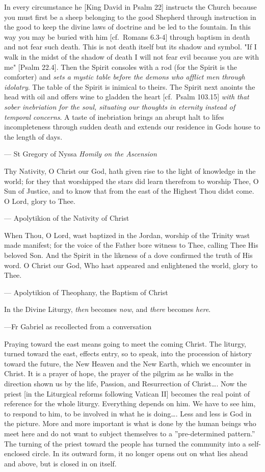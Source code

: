 \documentclass[
]{article}
\newcommand{\RL}[1]{\beginR #1\endR}
\begin{document}
In every circumstance he {[}King David in Psalm 22{]} instructs the
Church because you must first be a sheep belonging to the good Shepherd
through instruction in the good to keep the divine laws of doctrine and
be led to the fountain. In this way you may be buried with him
{[}cf.~Romans 6.3-4{]} through baptism in death and not fear such death.
This is not death itself but its shadow and symbol. "If I walk in the
midst of the shadow of death I will not fear evil because you are with
me" {[}Psalm 22.4{]}. Then the Spirit consoles with a rod (for the
Spirit is the comforter) and \emph{sets a mystic table before the demons
who afflict men through idolatry}. The table of the Spirit is inimical
to theirs. The Spirit next anoints the head with oil and offers wine to
gladden the heart {[}cf.~Psalm 103.15{]} \emph{with that sober
inebriation for the soul, situating our thoughts in eternity instead of
temporal concerns}. A taste of inebriation brings an abrupt halt to
life\textquotesingle s incompleteness through sudden death and extends
our residence in God\textquotesingle s house to the length of days.

--- St Gregory of Nyssa \emph{Homily on the Ascension}

Thy Nativity, O Christ our God, hath given rise to the light of
knowledge in the world; for they that worshipped the stars did learn
therefrom to worship Thee, O Sun of Justice, and to know that from the
east of the Highest Thou didst come. O Lord, glory to Thee.

--- Apolytikion of the Nativity of Christ

When Thou, O Lord, wast baptized in the Jordan, worship of the Trinity
wast made manifest; for the voice of the Father bore witness to Thee,
calling Thee His beloved Son. And the Spirit in the likeness of a dove
confirmed the truth of His word. O Christ our God, Who hast appeared and
enlightened the world, glory to Thee.

--- Apolytikion of Theophany, the Baptism of Christ

In the Divine Liturgy, \emph{then} becomes \emph{now}, and \emph{there}
becomes \emph{here}.

---Fr Gabriel as recollected from a conversation

Praying toward the east means going to meet the coming Christ. The
liturgy, turned toward the east, effects entry, so to speak, into the
procession of history toward the future, the New Heaven and the New
Earth, which we encounter in Christ. It is a prayer of hope, the prayer
of the pilgrim as he walks in the direction shown us by the life,
Passion, and Resurrection of Christ\ldots. Now the priest {[}in the
Liturgical reforms following Vatican II{]} becomes the real point of
reference for the whole liturgy. Everything depends on him. We have to
see him, to respond to him, to be involved in what he is doing\ldots.
Less and less is God in the picture. More and more important is what is
done by the human beings who meet here and do not want to subject
themselves to a \RL{''}pre-determined pattern.'' The turning of the
priest toward the people has turned the community into a self-enclosed
circle. In its outward form, it no longer opens out on what lies ahead
and above, but is closed in on itself.
\end{document}
